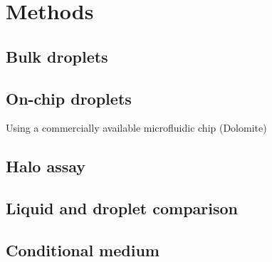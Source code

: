 \chapter{Methods}

\section{Bulk droplets}

\section{On-chip droplets}
Using a commercially available microfluidic chip (Dolomite)
\section{Halo assay}

\section{Liquid and droplet comparison}

\section{Conditional medium}